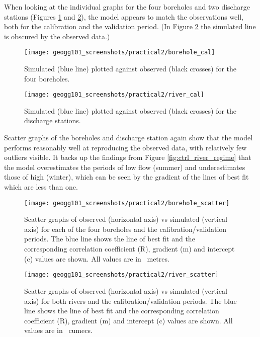 \documentclass{article}
\begin{document}
When looking at the individual graphs for the four boreholes and two discharge stations (Figures \ref{fig:borehole_cal} and \ref{fig:river_cal}), the model appears to match the observations well, both for the calibration and the validation period. (In Figure \ref{fig:river_cal} the simulated line is obscured by the observed data.)

\begin{figure}[!h]
    \centering
    \texttt{[image: geogg101\_screenshots/practical2/borehole\_cal]}
    \caption{Simulated (blue line) plotted against observed (black crosses) for the four boreholes.}
    \label{fig:borehole_cal}
\end{figure}

\begin{figure}[!h]
    \centering
    \texttt{[image: geogg101\_screenshots/practical2/river\_cal]}
    \caption{Simulated (blue line) plotted against observed (black crosses) for the discharge stations.}
    \label{fig:river_cal}
\end{figure}


\newpage
Scatter graphs of the boreholes and discharge station again show that the model performs reasonably well at reproducing the observed data, with relatively few outliers visible. It backs up the findings from Figure \ref{fig:ctrl_river_regime} that the model overestimates the periods of low flow (summer) and underestimates those of high (winter), which can be seen by the gradient of the lines of best fit which are less than one.

\begin{figure}[!h]
    \centering
    \texttt{[image: geogg101\_screenshots/practical2/borehole\_scatter]}
    \caption{Scatter graphs of observed (horizontal axis) vs simulated (vertical axis) for each of the four boreholes and the calibration/validation periods. The blue line shows the line of best fit and the corresponding correlation coefficient (R), gradient (m) and intercept (c) values are shown. All values are in \SI{}{metres}.}
    \label{fig:borehole_scatter}
\end{figure}

\begin{figure}[!h]
    \centering
    \texttt{[image: geogg101\_screenshots/practical2/river\_scatter]}
    \caption{Scatter graphs of observed (horizontal axis) vs simulated (vertical axis) for both rivers and the calibration/validation periods. The blue line shows the line of best fit and the corresponding correlation coefficient (R), gradient (m) and intercept (c) values are shown. All values are in \SI{}{cumecs}.}
    \label{fig:river_scatter}
\end{figure}
\end{document}

